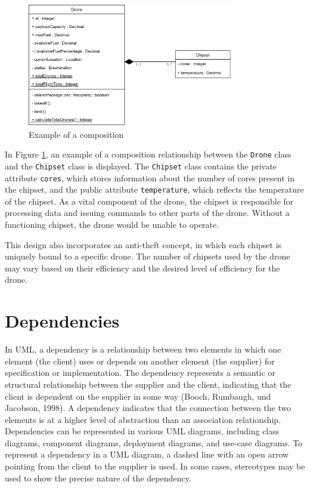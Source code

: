 \documentclass[
	12pt,
    a4paper,
    egregdoesnotlikesansseriftitles, %
    toc=chapterentrywithdots,
    oneside, openany,
    titlepage,
    parskip=half,
    headings=normal,  %
    listof=totoc,
    bibliography=totoc,
    index=totoc,
    captions=tableheading,  %
    listof=flat,
    numbers=noenddot, %
    final]
    {scrbook}
\begin{document}
\begin{figure}[h]
\centering
\includegraphics[width=0.8\textwidth]{figures/aggr_comp/comp.jpg}
\caption[Example composition]{Example of a composition}
\label{fig:composition_example}
\end{figure}


In Figure \ref{fig:composition_example}, an example of a composition relationship between the \texttt{Drone} class and the \texttt{Chipset} class is displayed. The \texttt{Chipset} class contains the private attribute \texttt{cores}, which stores information about the number of cores present in the chipset, and the public attribute \texttt{temperature}, which reflects the temperature of the chipset. As a vital component of the drone, the chipset is responsible for processing data and issuing commands to other parts of the drone. Without a functioning chipset, the drone would be unable to operate.

This design also incorporates an anti-theft concept, in which each chipset is uniquely bound to a specific drone. The number of chipsets used by the drone may vary based on their efficiency and the desired level of efficiency for the drone.


\section{Dependencies}

In UML, a dependency is a relationship between two elements in which one element (the client) uses or depends on another element (the supplier) for specification or implementation.
The dependency represents a semantic or structural relationship between the supplier and the client, indicating that the client is dependent on the supplier in some way (Booch, Rumbaugh, und Jacobson, 1998).
A dependency indicates that the connection between the two elements is at a higher level of abstraction than an association relationship.
Dependencies can be represented in various UML diagrams, including class diagrams, component diagrams, deployment diagrams, and use-case diagrams. 
To represent a dependency in a UML diagram, a dashed line with an open arrow pointing from the client to the supplier is used. 
In some cases, stereotypes may be used to show the precise nature of the dependency.
\end{document}
